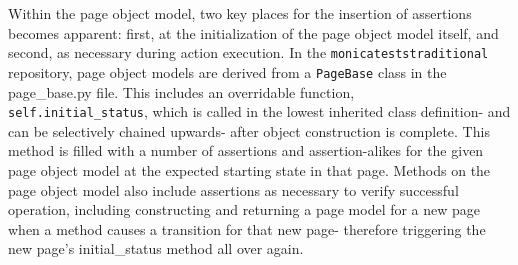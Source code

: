 Within the page object model, two key places for the insertion of assertions becomes apparent: first, at the initialization of the page object model itself, and second, as necessary during action execution. In the \texttt{monica\-tests\-traditional} repository, page object models are derived from a \texttt{PageBase} class in the page\_base.py file. This includes an overridable function, \\\texttt{self.initial\_status}, which is called in the lowest inherited class definition- and can be selectively chained upwards- after object construction is complete. This method is filled with a number of assertions and assertion-alikes for the given page object model at the expected starting state in that page. Methods on the page object model also include assertions as necessary to verify successful operation, including constructing and returning a page model for a new page when a method causes a transition for that new page- therefore triggering the new page's initial\_status method all over again.
